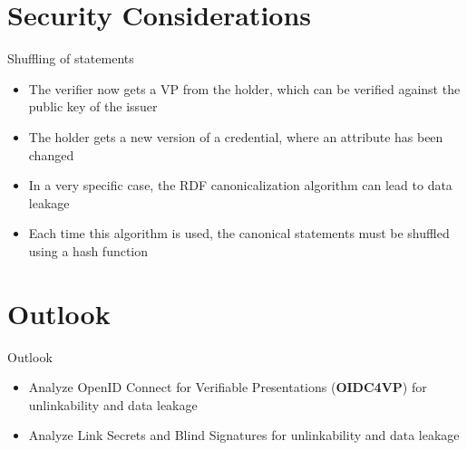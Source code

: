\documentclass[
	english,%
	authorontitle=true,
	]{bfhbeamer}
\begin{document}
\section{Security Considerations}

\begin{frame}{Shuffling of statements}
    \begin{itemize}
        \item The verifier now gets a VP from the holder, which can be verified against the public key of the issuer
        \item The holder gets a new version of a credential, where an attribute has been changed
        \item In a very specific case, the RDF canonicalization algorithm can lead to data leakage
        \item Each time this algorithm is used, the canonical statements must be shuffled using a hash function
    \end{itemize}
\end{frame}

\section{Outlook}

\begin{frame}{Outlook}
    \begin{itemize}
        \item Analyze OpenID Connect for Verifiable Presentations (\textbf{OIDC4VP}) for unlinkability and data leakage
        \item Analyze Link Secrets and Blind Signatures for unlinkability and data leakage
    \end{itemize}
\end{frame}
\end{document}
